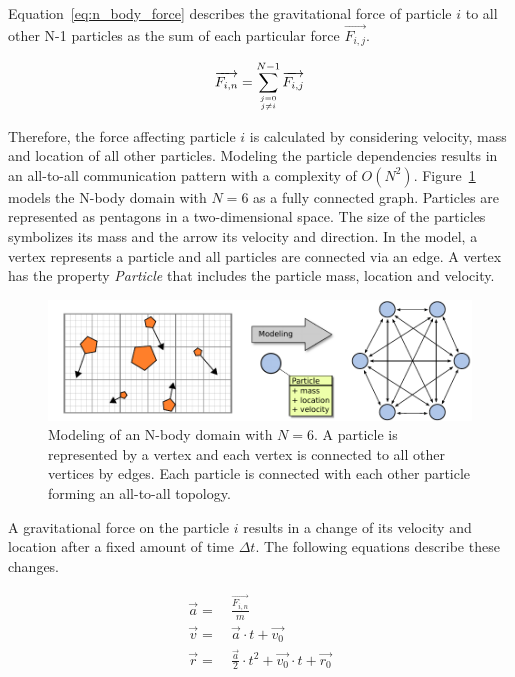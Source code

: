 \noindent Equation~\ref{eq:n_body_force} describes the gravitational force of
particle $i$ to all other N-1 particles as the sum of each particular
force $\overrightarrow{F_{i,j}}$.

\begin{equation}
  \label{eq:n_body_force}
  \overrightarrow{F_{i,n}} = \sum_{j = 0 \atop j \neq i}^{N-1} \overrightarrow{F_{i,j}}
\end{equation}

\noindent Therefore, the force affecting particle $i$ is calculated by
considering velocity, mass and location of all other
particles. Modeling the particle dependencies results in an all-to-all
communication pattern with a complexity of
$O(N^2)$. Figure~\ref{fig:nbody_modeling} models the N-body domain
with $N = 6$ as a fully connected graph. Particles are represented as
pentagons in a two-dimensional space. The size of the particles
symbolizes its mass and the arrow its velocity and direction.  In the
model, a vertex represents a particle and all particles are connected
via an edge. A vertex has the property \emph{Particle} that includes
the particle mass, location and velocity.

\begin{figure}[H]
  \centering \includegraphics[width=\textwidth]{graphics/30_nbody_modeling}
  \caption{Modeling of an N-body domain with $N = 6$. A particle is
    represented by a vertex and each vertex is connected to all other
    vertices by edges. Each particle is connected with each other
    particle forming an all-to-all topology.}
  \label{fig:nbody_modeling}
\end{figure}

\noindent A gravitational force on the particle $i$ results in a change of its velocity and
location after a fixed amount of time $\Delta t$. The following equations describe these
changes.

\begin{align}
  \label{eq:n_body_update}
  \overrightarrow{a} =&~ \frac{\overrightarrow{F_{i,n}}}{m}\\
  \overrightarrow{v} =&~ \overrightarrow{a} \cdot t + \overrightarrow{v_0}\\
  \overrightarrow{r} =&~ \frac{\overrightarrow{a}}{2} \cdot t^2 + \overrightarrow{v_0} \cdot t + \overrightarrow{r_0}
\end{align}


